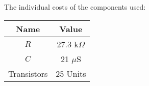 The individual costs of the components used: 

\begin{center}
  \begin{tabular}{ | c | c | }
    \hline    
    {\bf Name} & {\bf Value} \\ \hline
    $R$ & 27.3 k$\Omega$ \\ \hline 
    $C$ & 21 $\mu$S \\ \hline
    Transistors & 25 Units \\ 
    \hline
  \end{tabular}
\end{center}



